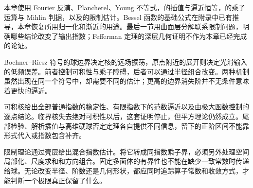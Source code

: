 \ProseParagraphBreak

本章使用 Fourier 反演、Plancherel、Young 不等式，的插值与逼近恒等，的乘子运算与 Mihlin 判据，以及的限制估计。Bessel 函数的基础公式在附录中已有推导，本章恢复所用归一化和渐近的用途。最后一节用曲面层分解联系限制问题，明确哪些结论改变了输出指数；Fefferman 定理的深层几何证明不作为本章已经完成的论证。






\begin{chaptersummary}
Bochner--Riesz 符号的球边界决定核的远场振荡，原点附近的展开则决定光滑输入的低频误差。前者控制可积性与乘子障碍，后者可以通过半径组合改变。两种机制虽然出现在同一个符号中，却需要不同的估计；更高的边界消失阶并不无条件意味着更快的逼近。

\ProseParagraphBreak

可积核给出全部普通指数的稳定性、有限指数下的范数逼近以及由极大函数控制的逐点结论。临界核失去绝对可积性以后，这套证明停止，但平方理论仍然成立。尾部检验、解析插值与高维硬球否定定理各自提供不同信息，留下的正阶区间不能靠形式代入或指数包含补齐。

\ProseParagraphBreak

限制理论通过壳层给出混合指数估计。将它转成同指数乘子界，必须另外处理空间局部化、尺度求和和方向组合。固定多面体的有界性也不能在缺少一致常数时传递给球。无论改变半径、阶数还是几何形状，都应同时追踪算子常数和收敛方式，才能判断一个极限真正保留了什么。
\end{chaptersummary}

\BookExercises

